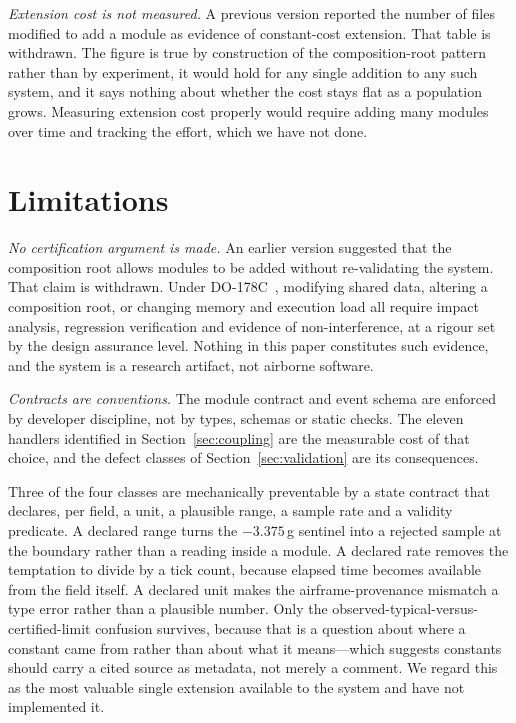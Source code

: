\documentclass[conference]{IEEEtran}
\begin{document}
\textit{Extension cost is not measured.} A previous version reported the number
of files modified to add a module as evidence of constant-cost extension. That
table is withdrawn. The figure is true by construction of the composition-root
pattern rather than by experiment, it would hold for any single addition to
any such system, and it says nothing about whether the cost stays flat as a
population grows. Measuring extension cost properly would require adding many
modules over time and tracking the effort, which we have not done.

\section{Limitations}
\label{sec:limits}

\textit{No certification argument is made.} An earlier version suggested that
the composition root allows modules to be added without re-validating the
system. That claim is withdrawn. Under DO-178C~\cite{do178c}, modifying shared
data, altering a composition root, or changing memory and execution load all
require impact analysis, regression verification and evidence of
non-interference, at a rigour set by the design assurance level. Nothing in
this paper constitutes such evidence, and the system is a research artifact,
not airborne software.

\textit{Contracts are conventions.} The module contract and event schema are
enforced by developer discipline, not by types, schemas or static checks. The
eleven handlers identified in Section~\ref{sec:coupling} are the measurable
cost of that choice, and the defect classes of Section~\ref{sec:validation}
are its consequences.

Three of the four classes are mechanically preventable by a state contract
that declares, per field, a unit, a plausible range, a sample rate and a
validity predicate. A declared range turns the $-3.375$\,g sentinel into a
rejected sample at the boundary rather than a reading inside a module. A
declared rate removes the temptation to divide by a tick count, because
elapsed time becomes available from the field itself. A declared unit makes
the airframe-provenance mismatch a type error rather than a plausible number.
Only the observed-typical-versus-certified-limit confusion survives, because
that is a question about where a constant came from rather than about what it
means---which suggests constants should carry a cited source as metadata, not
merely a comment. We regard this as the most valuable single extension
available to the system and have not implemented it.
\end{document}
